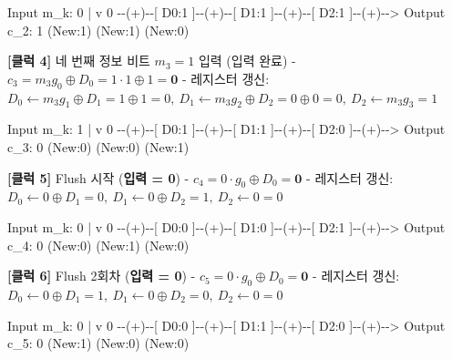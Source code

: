 \documentclass[
  oneside]{article}
\newenvironment{Shaded}{}{}
\newcommand{\NormalTok}[1]{#1}
\begin{document}
\begin{Shaded}
\begin{Highlighting}[]
\NormalTok{  Input m\_k: 0}
\NormalTok{       |}
\NormalTok{       v}
\NormalTok{  0 {-}{-}(+){-}{-}[ D0:1 ]{-}{-}(+){-}{-}[ D1:1 ]{-}{-}(+){-}{-}[ D2:1 ]{-}{-}(+){-}{-}\textgreater{} Output c\_2: 1}
\NormalTok{           (New:1)        (New:1)        (New:0)}
\end{Highlighting}
\end{Shaded}

\textbf{{[}클럭 4{]}} 네 번째 정보 비트 \textbf{\(m_3 = 1\)} 입력 (입력
완료) - \(c_3 = m_3 g_0 \oplus D_0 = 1 \cdot 1 \oplus 1 = \mathbf{0}\) -
레지스터 갱신:
\(D_0 \leftarrow m_3 g_1 \oplus D_1 = 1 \oplus 1 = 0, \ D_1 \leftarrow m_3 g_2 \oplus D_2 = 0 \oplus 0 = 0, \ D_2 \leftarrow m_3 g_3 = 1\)

\begin{Shaded}
\begin{Highlighting}[]
\NormalTok{  Input m\_k: 1}
\NormalTok{       |}
\NormalTok{       v}
\NormalTok{  0 {-}{-}(+){-}{-}[ D0:1 ]{-}{-}(+){-}{-}[ D1:1 ]{-}{-}(+){-}{-}[ D2:0 ]{-}{-}(+){-}{-}\textgreater{} Output c\_3: 0}
\NormalTok{           (New:0)        (New:0)        (New:1)}
\end{Highlighting}
\end{Shaded}

\textbf{{[}클럭 5{]}} Flush 시작 (\textbf{입력 = 0}) -
\(c_4 = 0 \cdot g_0 \oplus D_0 = \mathbf{0}\) - 레지스터 갱신:
\(D_0 \leftarrow 0 \oplus D_1 = 0, \ D_1 \leftarrow 0 \oplus D_2 = 1, \ D_2 \leftarrow 0 = 0\)

\begin{Shaded}
\begin{Highlighting}[]
\NormalTok{  Input m\_k: 0}
\NormalTok{       |}
\NormalTok{       v}
\NormalTok{  0 {-}{-}(+){-}{-}[ D0:0 ]{-}{-}(+){-}{-}[ D1:0 ]{-}{-}(+){-}{-}[ D2:1 ]{-}{-}(+){-}{-}\textgreater{} Output c\_4: 0}
\NormalTok{           (New:0)        (New:1)        (New:0)}
\end{Highlighting}
\end{Shaded}

\textbf{{[}클럭 6{]}} Flush 2회차 (\textbf{입력 = 0}) -
\(c_5 = 0 \cdot g_0 \oplus D_0 = \mathbf{0}\) - 레지스터 갱신:
\(D_0 \leftarrow 0 \oplus D_1 = 1, \ D_1 \leftarrow 0 \oplus D_2 = 0, \ D_2 \leftarrow 0 = 0\)

\begin{Shaded}
\begin{Highlighting}[]
\NormalTok{  Input m\_k: 0}
\NormalTok{       |}
\NormalTok{       v}
\NormalTok{  0 {-}{-}(+){-}{-}[ D0:0 ]{-}{-}(+){-}{-}[ D1:1 ]{-}{-}(+){-}{-}[ D2:0 ]{-}{-}(+){-}{-}\textgreater{} Output c\_5: 0}
\NormalTok{           (New:1)        (New:0)        (New:0)}
\end{Highlighting}
\end{Shaded}
\end{document}
